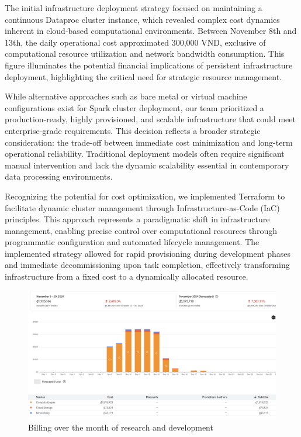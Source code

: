The initial infrastructure deployment strategy focused on maintaining a continuous Dataproc cluster
instance, which revealed complex cost dynamics inherent in cloud-based computational environments.
Between November 8th and 13th, the daily operational cost approximated 300,000 VND, exclusive of
computational resource utilization and network bandwidth consumption. This figure illuminates the
potential financial implications of persistent infrastructure deployment, highlighting the critical
need for strategic resource management.

While alternative approaches such as bare metal or virtual machine configurations exist for Spark
cluster deployment, our team prioritized a production-ready, highly provisioned, and scalable
infrastructure that could meet enterprise-grade requirements. This decision reflects a broader
strategic consideration: the trade-off between immediate cost minimization and long-term operational
reliability. Traditional deployment models often require significant manual intervention and lack
the dynamic scalability essential in contemporary data processing environments.

Recognizing the potential for cost optimization, we implemented Terraform to facilitate dynamic
cluster management through Infrastructure-as-Code (IaC) principles. This approach represents a
paradigmatic shift in infrastructure management, enabling precise control over computational
resources through programmatic configuration and automated lifecycle management. The implemented
strategy allowed for rapid provisioning during development phases and immediate decommissioning upon
task completion, effectively transforming infrastructure from a fixed cost to a dynamically
allocated resource.

\begin{figure}
    \centering
    \includegraphics[width=0.8\linewidth]{images/billing.png}
    \caption{Billing over the month of research and development}
\end{figure}

